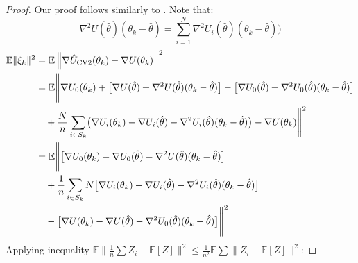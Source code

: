 \begin{proof}
Our proof follows similarly to \citet{baker2017}.
Note that:
$$\nabla^2 U(\hat\theta)(\theta_k - \hat\theta) = \sum_{i=1}^N \nabla^2 U_i(\hat\theta)(\theta_k - \hat\theta)\bigr)$$
\begin{align*}
\mathbb{E}\|\xi_k\|^2 
&= \mathbb{E}\left\|\nabla\hat{U}_{\text{CV2}}(\theta_k) - \nabla U(\theta_k)\right\|^2 \\
&= \mathbb{E}\Bigg\|
    \nabla U_0(\theta_k) + \bigl[\nabla U(\hat\theta) 
        + \nabla^2 U(\hat\theta)(\theta_k - \hat\theta)\bigr] - \bigl[\nabla U_0(\hat\theta) 
        + \nabla^2 U_0(\hat\theta)(\theta_k - \hat\theta)\bigr] \notag\\
    &\quad + \frac{N}{n}\sum_{i \in S_k}\bigl(\nabla U_i(\theta_k) 
        - \nabla U_i(\hat\theta) 
        - \nabla^2 U_i(\hat\theta)(\theta_k - \hat\theta)\bigr) - \nabla U(\theta_k)
    \Bigg\|^2 \\
&= \mathbb{E}\Bigg\|
    \bigl[\nabla U_0(\theta_k) - \nabla U_0(\hat\theta) - \nabla^2 U(\hat\theta)(\theta_k - \hat\theta)\bigr] \\
&\quad + \frac{1}{n}\sum_{i \in S_k} N\bigl[\nabla U_i(\theta_k) 
        - \nabla U_i(\hat\theta) 
        - \nabla^2 U_i(\hat\theta)(\theta_k - \hat\theta)\bigr] \notag\\
    &\quad - \bigl[\nabla U(\theta_k) - \nabla U(\hat\theta) - \nabla^2 U_0(\hat\theta)(\theta_k - \hat\theta)\bigr]
    \Bigg\|^2 \\
\end{align*}
Applying inequality $\mathbb{E}\|\frac{1}{n}\sum Z_i - \mathbb{E}[Z]\|^2 \leq \frac{1}{n^2}\mathbb{E}\sum\|Z_i - \mathbb{E}[Z]\|^2$:


\end{proof}
